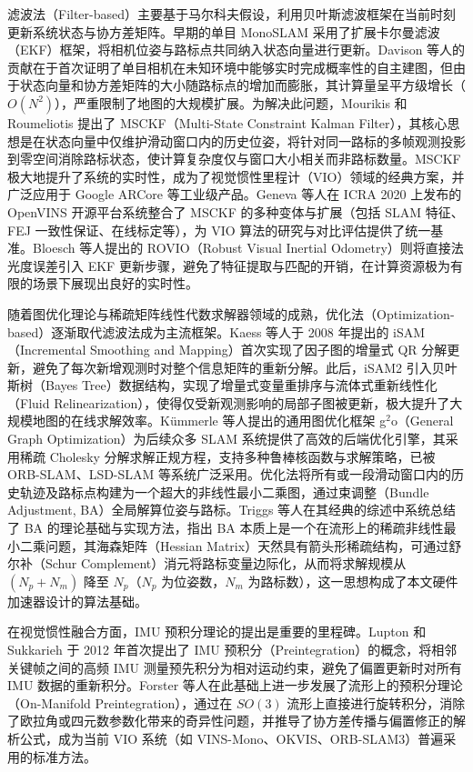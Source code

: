 滤波法（Filter-based）主要基于马尔科夫假设，利用贝叶斯滤波框架在当前时刻更新系统状态与协方差矩阵。早期的单目 MonoSLAM\cite{davison2007monoslam} 采用了扩展卡尔曼滤波（EKF）框架，将相机位姿与路标点共同纳入状态向量进行更新。Davison 等人的贡献在于首次证明了单目相机在未知环境中能够实时完成概率性的自主建图，但由于状态向量和协方差矩阵的大小随路标点的增加而膨胀，其计算量呈平方级增长（$O(N^2)$），严重限制了地图的大规模扩展。为解决此问题，Mourikis 和 Roumeliotis\cite{mourikis2007multi} 提出了 MSCKF（Multi-State Constraint Kalman Filter），其核心思想是在状态向量中仅维护滑动窗口内的历史位姿，将针对同一路标的多帧观测投影到零空间消除路标状态，使计算复杂度仅与窗口大小相关而非路标数量。MSCKF 极大地提升了系统的实时性，成为了视觉惯性里程计（VIO）领域的经典方案，并广泛应用于 Google ARCore 等工业级产品。Geneva 等人\cite{geneva2020openvins}在 ICRA 2020 上发布的 OpenVINS 开源平台系统整合了 MSCKF 的多种变体与扩展（包括 SLAM 特征、FEJ 一致性保证、在线标定等），为 VIO 算法的研究与对比评估提供了统一基准。Bloesch 等人\cite{bloesch2015robust}提出的 ROVIO（Robust Visual Inertial Odometry）则将直接法光度误差引入 EKF 更新步骤，避免了特征提取与匹配的开销，在计算资源极为有限的场景下展现出良好的实时性。

随着图优化理论与稀疏矩阵线性代数求解器领域的成熟，优化法（Optimization-based）逐渐取代滤波法成为主流框架。Kaess 等人\cite{kaess2008isam}于 2008 年提出的 iSAM（Incremental Smoothing and Mapping）首次实现了因子图的增量式 QR 分解更新，避免了每次新增观测时对整个信息矩阵的重新分解。此后，iSAM2\cite{kaess2011isam2} 引入贝叶斯树（Bayes Tree）数据结构，实现了增量式变量重排序与流体式重新线性化（Fluid Relinearization），使得仅受新观测影响的局部子图被更新，极大提升了大规模地图的在线求解效率。K{\"u}mmerle 等人\cite{kummerle2011g}提出的通用图优化框架 g$^2$o（General Graph Optimization）为后续众多 SLAM 系统提供了高效的后端优化引擎，其采用稀疏 Cholesky 分解求解正规方程，支持多种鲁棒核函数与求解策略，已被 ORB-SLAM、LSD-SLAM 等系统广泛采用。优化法将所有或一段滑动窗口内的历史轨迹及路标点构建为一个超大的非线性最小二乘图，通过束调整（Bundle Adjustment, BA）全局解算位姿与路标。Triggs 等人\cite{triggs1999bundle}在其经典的综述中系统总结了 BA 的理论基础与实现方法，指出 BA 本质上是一个在流形上的稀疏非线性最小二乘问题，其海森矩阵（Hessian Matrix）天然具有箭头形稀疏结构，可通过舒尔补（Schur Complement）消元将路标变量边际化，从而将求解规模从 $(N_p + N_m)$ 降至 $N_p$（$N_p$ 为位姿数，$N_m$ 为路标数），这一思想构成了本文硬件加速器设计的算法基础。

在视觉惯性融合方面，IMU 预积分理论的提出是重要的里程碑。Lupton 和 Sukkarieh\cite{lupton2012visual} 于 2012 年首次提出了 IMU 预积分（Preintegration）的概念，将相邻关键帧之间的高频 IMU 测量预先积分为相对运动约束，避免了偏置更新时对所有 IMU 数据的重新积分。Forster 等人\cite{forster2017onmanifold}在此基础上进一步发展了流形上的预积分理论（On-Manifold Preintegration），通过在 $SO(3)$ 流形上直接进行旋转积分，消除了欧拉角或四元数参数化带来的奇异性问题，并推导了协方差传播与偏置修正的解析公式，成为当前 VIO 系统（如 VINS-Mono、OKVIS、ORB-SLAM3）普遍采用的标准方法。

